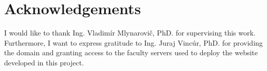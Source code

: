 \newpage
\thispagestyle{empty}
\section*{Acknowledgements}

I would like to thank Ing. Vladimír Mlynarovič, PhD. for supervising this work. Furthermore, I want to express gratitude to Ing. Juraj Vincúr, PhD. for providing the domain and granting access to the faculty servers used to deploy the website developed in this project.

\newpage
\thispagestyle{empty}
\mbox{}
\newpage
